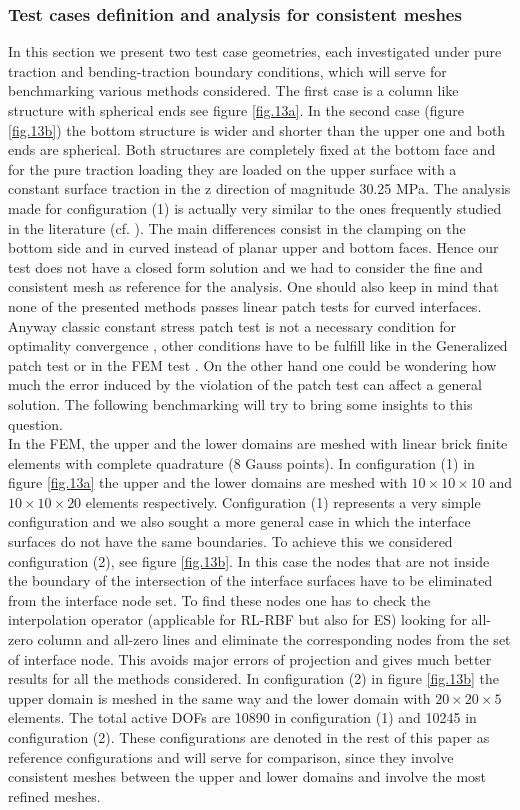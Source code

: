  \subsubsection{Test cases definition and analysis for consistent meshes}\label{ssec41}
 In this section we present two test case geometries, each investigated under pure traction and bending-traction boundary conditions, which will serve for benchmarking various methods considered. The first case is a column like structure with spherical ends see figure \ref{fig.13a}. In the second case (figure \ref{fig.13b}) the bottom structure is wider and shorter than the upper one and both ends are spherical. Both structures are completely fixed at the bottom face and for the pure traction loading they are loaded on the upper surface with a constant surface traction in the z direction of magnitude 30.25 MPa. The analysis made for configuration (1) is actually very similar to the ones frequently studied in the literature (cf. \cite{song2017virtual}). The main differences consist in the clamping on the bottom side and in curved instead of planar upper and bottom faces. Hence our test does not have a closed form solution and we had to consider the fine and consistent mesh as reference for the analysis. One should also keep in mind that none of the presented methods passes linear patch tests for curved interfaces. Anyway classic constant stress patch test is not a necessary condition for optimality convergence \cite{stummel1980limitations}, other conditions have to be fulfill like in the Generalized patch test \cite{stummel1979generalized} or in the FEM test \cite{shi1987fem} . On the other hand one could be wondering how much the error induced by the violation of the patch test can affect a general solution. The following benchmarking will try to bring some insights to this question.\\
 In the FEM, the upper and the lower domains are meshed with linear brick finite elements with complete quadrature (8 Gauss points). In configuration (1) in figure \ref{fig.13a} the upper and the lower domains are meshed with $10\times10\times10$ and $10\times10\times20$ elements respectively. Configuration (1) represents a very simple configuration and we also sought a more general case in which the interface surfaces do not have the same boundaries. To achieve this we considered configuration (2), see figure \ref{fig.13b}. In this case the nodes that are not inside the boundary of the intersection of the interface surfaces have to be eliminated from the interface node set. To find these nodes one has to check the interpolation operator (applicable for RL-RBF but also for ES) looking for all-zero column and all-zero lines and eliminate the corresponding nodes from the set of interface node. This avoids major errors of projection and gives much better results for all the methods considered. In configuration (2) in figure \ref{fig.13b} the upper domain is meshed in the same way and the lower domain with $20\times20\times5$ elements. The total active DOFs are 10890 in configuration (1) and 10245 in configuration (2). These configurations are denoted in the rest of this paper as reference configurations and will serve for comparison, since they involve consistent meshes between the upper and lower domains and involve the most refined meshes.
